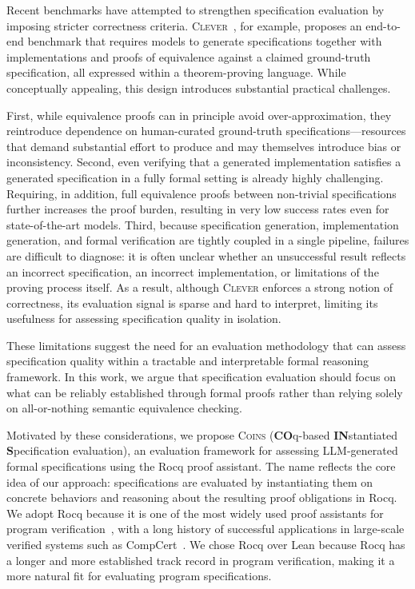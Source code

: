 Recent benchmarks have attempted to strengthen specification evaluation by imposing stricter correctness criteria. \textsc{Clever}~\cite{thakur2025clever}, for example, proposes an end-to-end benchmark that requires models to generate specifications together with implementations and proofs of equivalence against a claimed ground-truth specification, all expressed within a theorem-proving language. While conceptually appealing, this design introduces substantial practical challenges. 

First, while equivalence proofs can in principle avoid over-approximation, they reintroduce dependence on human-curated ground-truth specifications—resources that demand substantial effort to produce and may themselves introduce bias or inconsistency. Second, even verifying that a generated implementation satisfies a generated specification in a fully formal setting is already highly challenging. Requiring, in addition, full equivalence proofs between non-trivial specifications further increases the proof burden, resulting in very low success rates even for state-of-the-art models. Third, because specification generation, implementation generation, and formal verification are tightly coupled in a single pipeline, failures are difficult to diagnose: it is often unclear whether an unsuccessful result reflects an incorrect specification, an incorrect implementation, or limitations of the proving process itself. As a result, although \textsc{Clever} enforces a strong notion of correctness, its evaluation signal is sparse and hard to interpret, limiting its usefulness for assessing specification quality in isolation.



These limitations suggest the need for an evaluation methodology that can assess specification quality within a tractable and interpretable formal reasoning framework. In this work, we argue that specification evaluation should focus on what can be reliably established through formal proofs rather than relying solely on all-or-nothing semantic equivalence checking.

Motivated by these considerations, we propose \textsc{Coins} (\textbf{CO}q-based \textbf{IN}stantiated \textbf{S}pecification evaluation), an evaluation framework for assessing LLM-generated formal specifications using the Rocq proof assistant. The name reflects the core idea of our approach: specifications are evaluated by instantiating them on concrete behaviors and reasoning about the resulting proof obligations in Rocq. We adopt Rocq because it is one of the most widely used proof assistants for program verification~\cite{leroy2016compcert,cao2018vst,zhou2024vst,wu2025qcp}, with a long history of successful applications in large-scale verified systems such as CompCert~\cite{leroy2016compcert}. We chose Rocq over Lean because Rocq has a longer and more established track record in program verification, making it a more natural fit for evaluating program specifications.


